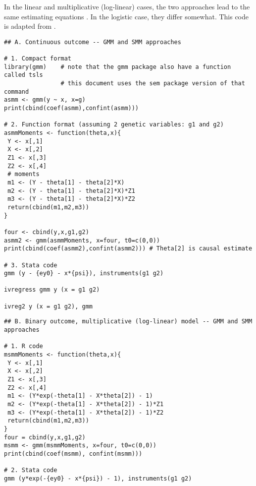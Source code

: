 \documentclass[a4paper,12pt]{article} %
\begin{document}
In the linear and multiplicative (log-linear) cases, the two approaches lead to the same estimating equations \citep{clarke2011}. In the logistic case, they differ somewhat. This code is adapted from \cite{clarke2011}.

\begin{lstlisting}
## A. Continuous outcome -- GMM and SMM approaches

# 1. Compact format
library(gmm)    # note that the gmm package also have a function called tsls
                # this document uses the sem package version of that command
asmm <- gmm(y ~ x, x=g)
print(cbind(coef(asmm),confint(asmm)))

# 2. Function format (assuming 2 genetic variables: g1 and g2)
asmmMoments <- function(theta,x){
 Y <- x[,1]
 X <- x[,2]
 Z1 <- x[,3]
 Z2 <- x[,4]
 # moments
 m1 <- (Y - theta[1] - theta[2]*X)
 m2 <- (Y - theta[1] - theta[2]*X)*Z1
 m3 <- (Y - theta[1] - theta[2]*X)*Z2
 return(cbind(m1,m2,m3))
}

four <- cbind(y,x,g1,g2)
asmm2 <- gmm(asmmMoments, x=four, t0=c(0,0))
print(cbind(coef(asmm2),confint(asmm2))) # Theta[2] is causal estimate

# 3. Stata code
gmm (y - {ey0} - x*{psi}), instruments(g1 g2)

ivregress gmm y (x = g1 g2)

ivreg2 y (x = g1 g2), gmm
\end{lstlisting}


\begin{lstlisting}
## B. Binary outcome, multiplicative (log-linear) model -- GMM and SMM approaches

# 1. R code
msmmMoments <- function(theta,x){
 Y <- x[,1]
 X <- x[,2]
 Z1 <- x[,3]
 Z2 <- x[,4]
 m1 <- (Y*exp(-theta[1] - X*theta[2]) - 1)
 m2 <- (Y*exp(-theta[1] - X*theta[2]) - 1)*Z1
 m3 <- (Y*exp(-theta[1] - X*theta[2]) - 1)*Z2
 return(cbind(m1,m2,m3))
}
four = cbind(y,x,g1,g2)
msmm <- gmm(msmmMoments, x=four, t0=c(0,0))
print(cbind(coef(msmm), confint(msmm)))

# 2. Stata code
gmm (y*exp(-{ey0} - x*{psi}) - 1), instruments(g1 g2)
\end{lstlisting}
\end{document}
